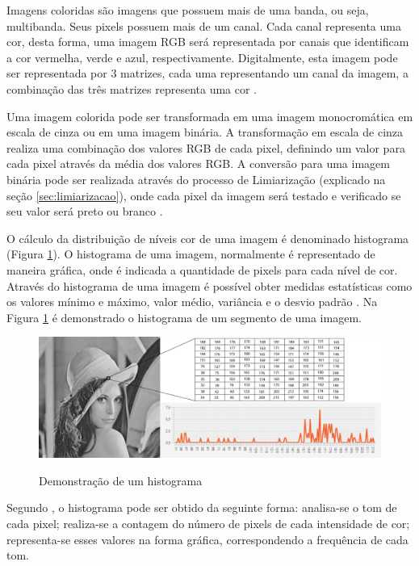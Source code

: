 \documentclass[
	12pt,				%
	oneside,			%
	a4paper,			%
	english,			%
	french,				%
	spanish,			%
	brazil,				%
	]{abntex2}
\begin{document}
Imagens coloridas são imagens que possuem mais de uma banda, ou seja, multibanda. Seus pixels possuem mais de um canal. Cada canal representa uma cor, desta forma, uma imagem RGB será representada por canais que identificam a cor vermelha, verde e azul, respectivamente. Digitalmente, esta imagem pode ser representada por 3 matrizes, cada uma representando um canal da imagem, a combinação das três matrizes representa uma cor \cite{conciAzevedoLeta:2008}.

Uma imagem colorida pode ser transformada em uma imagem monocromática em escala de cinza ou em uma imagem binária. A transformação em escala de cinza realiza uma combinação dos valores RGB de cada pixel, definindo um valor para cada pixel através da média dos valores RGB. A conversão para uma imagem binária pode ser realizada através do processo de Limiarização (explicado na seção \ref{sec:limiarizacao}), onde cada pixel da imagem será testado e verificado se seu valor será preto ou branco \cite{mossmann2010extraccao}.

O cálculo da distribuição de níveis cor de uma imagem é denominado histograma (Figura \ref{fig:histograma}). O histograma de uma imagem, normalmente é representado de maneira gráfica, onde é indicada a quantidade de pixels para cada nível de cor. Através do histograma de uma imagem é possível obter medidas estatísticas como os valores mínimo e máximo, valor médio, variância e o desvio padrão \cite{gonzalesWoods:2008}. Na Figura \ref{fig:histograma} é demonstrado o histograma de um segmento de uma imagem. 

\begin{figure}[ht]
\centering
\caption{Demonstração de um histograma}
\includegraphics[width=1\textwidth]{imagens/histograma.png}
\label{fig:histograma}
\sourceAuthor
\end{figure}

Segundo \citet{conciAzevedoLeta:2008}, o histograma pode ser obtido da seguinte forma: analisa-se o tom de cada pixel; realiza-se a contagem do número de pixels de cada intensidade de cor; representa-se esses valores na forma gráfica, correspondendo a frequência de cada tom.
\end{document}
